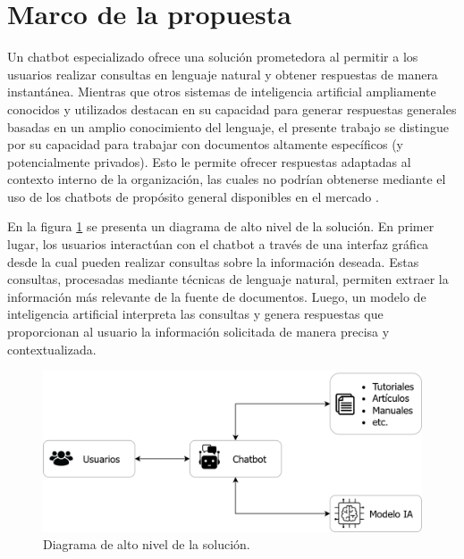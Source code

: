 \section{Marco de la propuesta}

Un chatbot especializado ofrece una solución prometedora al permitir a los usuarios realizar 
consultas en lenguaje natural y obtener respuestas de manera instantánea. Mientras que otros sistemas 
de inteligencia artificial ampliamente conocidos y utilizados 
destacan en su capacidad para generar respuestas generales basadas en un amplio conocimiento del 
lenguaje, el presente trabajo se distingue por su capacidad para trabajar con documentos altamente 
específicos (y potencialmente privados). Esto le permite ofrecer respuestas adaptadas al contexto 
interno de la organización, las cuales no podrían obtenerse mediante el uso de los chatbots de 
propósito general disponibles en el mercado \citep{website:chatgpt} \citep{website:copilot} \citep{website:gemini}.

En la figura \ref{fig:diagrama-bloques-basico} se presenta un diagrama de alto nivel de la solución.
En primer lugar, los usuarios interactúan con el chatbot a través de una interfaz gráfica desde la
cual pueden realizar consultas sobre la información deseada. Estas consultas, procesadas mediante 
técnicas de lenguaje natural, permiten extraer la información más relevante de la fuente de documentos. 
Luego, un modelo de inteligencia artificial interpreta las consultas y genera respuestas que proporcionan 
al usuario la información solicitada de manera precisa y contextualizada.

\begin{figure}[ht]
	\centering
	\includegraphics[scale=.3]{./Figures/diagrama_bloques_basico.png}
	\caption{Diagrama de alto nivel de la solución.}
	\label{fig:diagrama-bloques-basico}
\end{figure}

